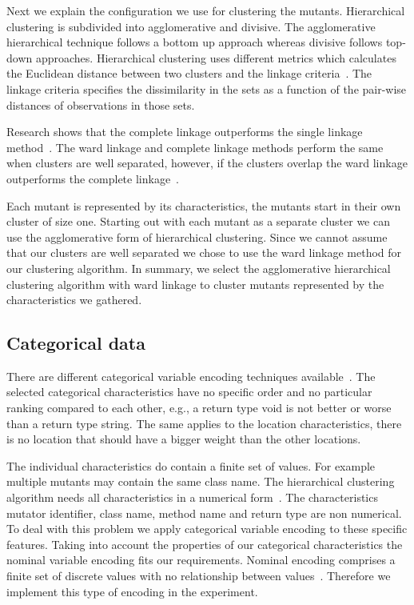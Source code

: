 \documentclass[conference,draftclsnofoot,onecolumn]{IEEEtran}
\begin{document}
Next we explain the configuration we use for clustering the mutants. 
Hierarchical clustering is subdivided into agglomerative and divisive. 
The agglomerative hierarchical technique follows a bottom up approach whereas divisive follows top-down approaches.
Hierarchical clustering uses different metrics which calculates the Euclidean distance between two clusters and the linkage criteria~\cite{Rajalingam2011}. 
The linkage criteria specifies the dissimilarity in the sets as a function of the pair-wise distances of observations in those sets.

Research shows that the complete linkage outperforms the single linkage method~\cite{Vijaya2019ComparativeClustering}. The ward linkage and complete linkage methods perform the same when clusters are well separated, however, if the clusters overlap the ward linkage outperforms the complete linkage~\cite{Vijaya2019ComparativeClustering}.

Each mutant is represented by its characteristics, the mutants start in their own cluster of size one.
Starting out with each mutant as a separate cluster we can use the agglomerative form of hierarchical clustering.
Since we cannot assume that our clusters are well separated we chose to use the ward linkage method for our clustering algorithm.
In summary, we select the agglomerative hierarchical clustering algorithm with ward linkage to cluster mutants represented by the characteristics we gathered.

\subsection{Categorical data}
There are different categorical variable encoding techniques available~\cite{Potdar2017AClassifiers}.
The selected categorical characteristics have  no specific order and no particular ranking compared to each other, e.g., a return type void is not better or worse than a return type string.
The same applies to the location characteristics, there is no location that should have a bigger weight than the other locations.

The individual characteristics do contain a finite set of values. For example multiple mutants may contain the same class name. The hierarchical clustering algorithm needs all characteristics in a numerical form~\cite{Vijaya2019ComparativeClustering}.
The characteristics mutator identifier, class name, method name and return type are non numerical.
To deal with this problem we apply categorical variable encoding to these specific features.
Taking into account the properties of our categorical characteristics the nominal variable encoding fits our requirements. Nominal encoding comprises a finite set of discrete values with no relationship between values~\cite{Potdar2017AClassifiers}.
Therefore we implement this type of encoding in the experiment.
\end{document}
